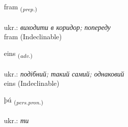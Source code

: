 \documentclass[frontgrid, backgrid]{flacards}\usepackage[]{graphicx}\usepackage[]{xcolor}
\begin{document}
\renewcommand{\blhead}{\vskip5pt {\small\bfseries\footnotesize Forsetning | прийменник }}
\renewcommand{\bcfoot}{\vskip5pt \hspace{2pt}{\small\bfseries\footnotesize 1K}}


{fram \small{\textsubscript{(\textit{prep.})}} \\[1ex]
\textphonetic{[fram]} \\
ukr.: \emph{виходити в коридор; попереду} \\  [2ex]
fram (Indeclinable)}


\renewcommand{\flhead}{\vskip5pt \fboxsep=0pt {\small\bfseries\footnotesize Atviksorð | прислівник}}
\renewcommand{\fcfoot}{\vskip5pt \fboxsep=0pt \hspace{2pt}{\small\bfseries\footnotesize 1K}}

\renewcommand{\blhead}{\vskip5pt {\small\bfseries\footnotesize Atviksorð | прислівник }}
\renewcommand{\bcfoot}{\vskip5pt \hspace{2pt}{\small\bfseries\footnotesize 1K}}


{eins \small{\textsubscript{(\textit{adv.})}} \\[1ex]
\textphonetic{[eins]} \\
ukr.: \emph{подібний; такий самий; однаковий} \\  [2ex]
eins (Indeclinable)}

\renewcommand{\flhead}{\vskip5pt \fboxsep=0pt {\small\bfseries\footnotesize Fornafn | займенник}}
\renewcommand{\fcfoot}{\vskip5pt \fboxsep=0pt \hspace{2pt}{\small\bfseries\footnotesize 1K}}

\renewcommand{\blhead}{\vskip5pt {\small\bfseries\footnotesize Fornafn | займенник }}
\renewcommand{\bcfoot}{\vskip5pt \hspace{2pt}{\small\bfseries\footnotesize 1K}}


{þú \small{\textsubscript{(\textit{pers.pron.})}} \\[1ex] %
\textphonetic{[θuː]} \\
ukr.: \emph{ти} \\  [2ex]
\renewcommand*{\arraystretch}{0.8}
}
\end{document}
